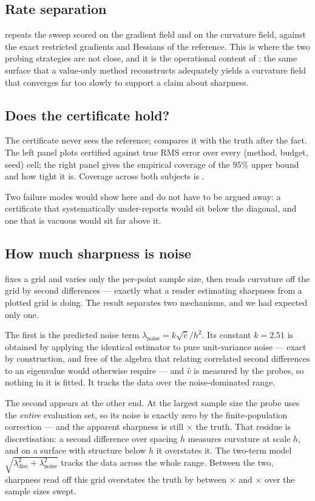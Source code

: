 \documentclass[11pt]{article}
\theoremstyle{definition}
\begin{document}
\subsection{Rate separation}

 repeats the sweep scored on the gradient field and on the curvature
field, against the exact restricted gradients and Hessians of the reference. This is
where the two probing strategies are not close, and it is the operational content of
: the same surface that a value-only method reconstructs adequately
yields a curvature field that converges far too slowly to support a claim about
sharpness.

\subsection{Does the certificate hold?}

The certificate never sees the reference;  compares it with the truth
after the fact. The left panel plots certified against true RMS error over every
(method, budget, seed) cell; the right panel gives the empirical coverage of the $95\%$
upper bound and how tight it is. Coverage across both subjects is \Coverage.

Two failure modes would show here and do not have to be argued away: a certificate that
systematically under-reports would sit below the diagonal, and one that is vacuous would
sit far above it.

\subsection{How much sharpness is noise}

 fixes a grid and varies only the per-point sample size, then reads
curvature off the grid by second differences --- exactly what a reader estimating
sharpness from a plotted grid is doing. The result separates two mechanisms, and we had
expected only one.

The first is the predicted noise term $\lambda_{\mathrm{noise}}=k\sqrt{\hat v}/h^2$. Its
constant $k=2.51$ is obtained by applying the identical estimator to pure unit-variance
noise --- exact by construction, and free of the algebra that relating correlated second
differences to an eigenvalue would otherwise require --- and $\hat v$ is measured by the
probes, so nothing in it is fitted. It tracks the data over the noise-dominated range.

The second appears at the other end. At the largest sample size the probe uses the
\emph{entire} evaluation set, so its noise is exactly zero by the finite-population
correction --- and the apparent sharpness is still \CNNsharpfloor$\times$ the truth.
That residue is discretisation: a second difference over spacing $h$ measures curvature
at scale $h$, and on a surface with structure below $h$ it overstates it. The two-term
model $\sqrt{\lambda_{\mathrm{disc}}^2+\lambda_{\mathrm{noise}}^2}$ tracks the data
across the whole range. Between the two, sharpness read off this grid overstates the
truth by between \CNNsharpfloor$\times$ and \CNNsharpworst$\times$ over the sample
sizes swept.
\end{document}

